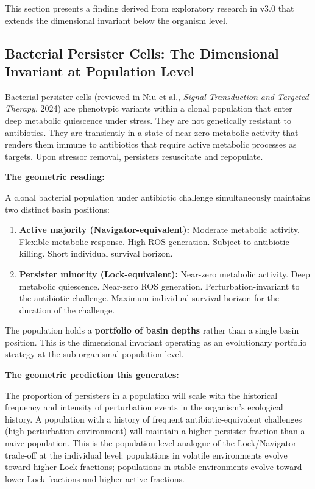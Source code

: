 \documentclass[10pt, a4paper]{article}
\begin{document}
This section presents a finding derived
from exploratory research in v3.0 that
extends the dimensional invariant below
the organism level.

\subsection{Bacterial Persister Cells:
The Dimensional Invariant at Population
Level}

Bacterial persister cells (reviewed in
Niu et al., \textit{Signal Transduction
and Targeted Therapy}, 2024) are
phenotypic variants within a clonal
population that enter deep metabolic
quiescence under stress. They are not
genetically resistant to antibiotics.
They are transiently in a state of
near-zero metabolic activity that renders
them immune to antibiotics that require
active metabolic processes as targets.
Upon stressor removal, persisters
resuscitate and repopulate.

\textbf{The geometric reading:}

A clonal bacterial population under
antibiotic challenge simultaneously
maintains two distinct basin positions:

\begin{enumerate}[itemsep=0.2em]
  \item \textbf{Active majority
    (Navigator-equivalent):} Moderate
    metabolic activity. Flexible metabolic
    response. High ROS generation.
    Subject to antibiotic killing. Short
    individual survival horizon.

  \item \textbf{Persister minority
    (Lock-equivalent):} Near-zero
    metabolic activity. Deep metabolic
    quiescence. Near-zero ROS generation.
    Perturbation-invariant to the
    antibiotic challenge. Maximum
    individual survival horizon for
    the duration of the challenge.
\end{enumerate}

The population holds a \textbf{portfolio
of basin depths} rather than a single
basin position. This is the dimensional
invariant operating as an evolutionary
portfolio strategy at the sub-organismal
population level.

\textbf{The geometric prediction this
generates:}

The proportion of persisters in a
population will scale with the historical
frequency and intensity of perturbation
events in the organism's ecological
history. A population with a history of
frequent antibiotic-equivalent challenges
(high-perturbation environment) will
maintain a higher persister fraction
than a naive population. This is the
population-level analogue of the
Lock/Navigator trade-off at the
individual level: populations in
volatile environments evolve toward
higher Lock fractions; populations in
stable environments evolve toward lower
Lock fractions and higher active fractions.
\end{document}
